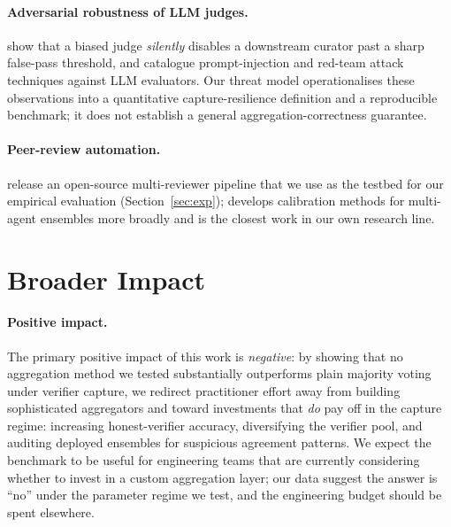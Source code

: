 \documentclass[11pt]{article}
\begin{document}
\paragraph{Adversarial robustness of LLM judges.}
\citet{zhang2026blindcurator} show that a biased judge \emph{silently}
disables a downstream curator past a sharp false-pass threshold, and
\citet{perez2022red,schulhoff2023ignore} catalogue prompt-injection and
red-team attack techniques against LLM evaluators. Our threat model
operationalises these observations into a quantitative capture-resilience
definition and a reproducible benchmark; it does not establish a general
aggregation-correctness guarantee.

\paragraph{Peer-review automation.}
\citet{liu2026paperreviewtoolkit} release an open-source multi-reviewer
pipeline that we use as the testbed for our empirical evaluation
(Section~\ref{sec:exp}); \citet{liu2026calibration} develops calibration
methods for multi-agent ensembles more broadly and is the closest work
in our own research line.

\section{Broader Impact}
\label{sec:broader}

\paragraph{Positive impact.}
The primary positive impact of this work is \emph{negative}: by
showing that no aggregation method we tested substantially outperforms
plain majority voting under verifier capture, we redirect practitioner
effort away from building sophisticated aggregators and toward
investments that \emph{do} pay off in the capture regime: increasing
honest-verifier accuracy, diversifying the verifier pool, and
auditing deployed ensembles for suspicious agreement patterns. We
expect the benchmark to be useful for engineering teams that are
currently considering whether to invest in a custom aggregation
layer; our data suggest the answer is ``no'' under the parameter
regime we test, and the engineering budget should be spent elsewhere.
\end{document}
